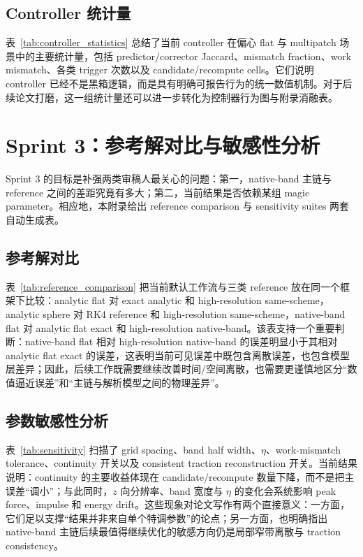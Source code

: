 \documentclass[11pt,a4paper]{ctexart}
\begin{document}
\subsection{Controller 统计量}
表~\ref{tab:controller_statistics} 总结了当前 controller 在偏心 flat 与 multipatch 场景中的主要统计量，包括 predictor/corrector Jaccard、mismatch fraction、work mismatch、各类 trigger 次数以及 candidate/recompute cells。它们说明 controller 已经不是黑箱逻辑，而是具有明确可报告行为的统一数值机制。对于后续论文打磨，这一组统计量还可以进一步转化为控制器行为图与附录消融表。



\section{Sprint 3：参考解对比与敏感性分析}
Sprint 3 的目标是补强两类审稿人最关心的问题：第一，native-band 主链与 reference 之间的差距究竟有多大；第二，当前结果是否依赖某组 magic parameter。相应地，本附录给出 reference comparison 与 sensitivity suites 两套自动生成表。

\subsection{参考解对比}
表~\ref{tab:reference_comparison} 把当前默认工作流与三类 reference 放在同一个框架下比较：analytic flat 对 exact analytic 和 high-resolution same-scheme，analytic sphere 对 RK4 reference 和 high-resolution same-scheme，native-band flat 对 analytic flat exact 和 high-resolution native-band。该表支持一个重要判断：native-band flat 相对 high-resolution native-band 的误差明显小于其相对 analytic flat exact 的误差，这表明当前可见误差中既包含离散误差，也包含模型层差异；因此，后续工作既需要继续改善时间/空间离散，也需要更谨慎地区分“数值逼近误差”和“主链与解析模型之间的物理差异”。



\subsection{参数敏感性分析}
表~\ref{tab:sensitivity} 扫描了 grid spacing、band half width、$\eta$、work-mismatch tolerance、continuity 开关以及 consistent traction reconstruction 开关。当前结果说明：continuity 的主要收益体现在 candidate/recompute 数量下降，而不是把主误差“调小”；与此同时，$z$ 向分辨率、band 宽度与 $\eta$ 的变化会系统影响 peak force、impulse 和 energy drift。这些现象对论文写作有两个直接意义：一方面，它们足以支撑“结果并非来自单个特调参数”的论点；另一方面，也明确指出 native-band 主链后续最值得继续优化的敏感方向仍是局部窄带离散与 traction consistency。
\end{document}
